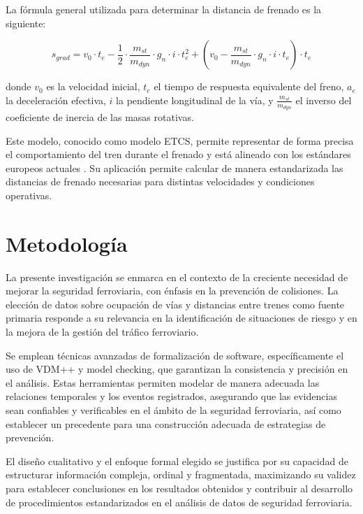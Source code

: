 \documentclass[journal]{IEEEtran}
\begin{document}
La fórmula general utilizada para determinar la distancia de frenado es la siguiente:

\begin{equation}
s_{grad} = v_0 \cdot t_e - \frac{1}{2} \cdot \frac{m_{st}}{m_{dyn}} \cdot g_n \cdot i \cdot t_e^2 + \left( v_0 - \frac{m_{st}}{m_{dyn}} \cdot g_n \cdot i \cdot t_e \right) \cdot t_e
\end{equation}

donde $v_0$ es la velocidad inicial, $t_e$ el tiempo de respuesta equivalente del freno, $a_e$ la deceleración efectiva, $i$ la pendiente longitudinal de la vía, y $\frac{m_{st}}{m_{dyn}}$ el inverso del coeficiente de inercia de las masas rotativas.

Este modelo, conocido como modelo ETCS, permite representar de forma precisa el comportamiento del tren durante el frenado y está alineado con los estándares europeos actuales \cite{aesf2023}. Su aplicación permite calcular de manera estandarizada las distancias de frenado necesarias para distintas velocidades y condiciones operativas.

\section{Metodología}  

La presente investigación se enmarca en el contexto de la creciente necesidad de mejorar la seguridad ferroviaria, con énfasis en la prevención de colisiones. La elección de datos sobre ocupación de vías y distancias entre trenes como fuente primaria responde a su relevancia en la identificación de situaciones de riesgo y en la mejora de la gestión del tráfico ferroviario.  

Se emplean técnicas avanzadas de formalización de software, específicamente el uso de VDM++ y model checking, que garantizan la consistencia y precisión en el análisis. Estas herramientas permiten modelar de manera adecuada las relaciones temporales y los eventos registrados, asegurando que las evidencias sean confiables y verificables en el ámbito de la seguridad ferroviaria, así como establecer un precedente para una construcción adecuada de estrategias de prevención.  

El diseño cualitativo y el enfoque formal elegido se justifica por su capacidad de estructurar información compleja, ordinal y fragmentada, maximizando su validez para establecer conclusiones en los resultados obtenidos y contribuir al desarrollo de procedimientos estandarizados en el análisis de datos de seguridad ferroviaria.  
\end{document}
